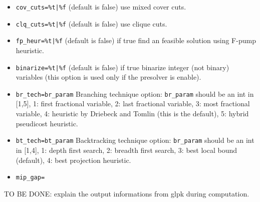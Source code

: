 \begin{mandescription}
\begin{description}
\begin{itemize}
\item \verb+cov_cuts=%t|%f+ (default is false) use mixed cover cuts.
\item \verb+clq_cuts=%t|%f+ (default is false) use clique cuts.
\item \verb+fp_heur=%t|%f+ (default is false) if true find an feasible solution using F-pump heuristic.
\item \verb+binarize=%t|%f+ (default is false) if true binarize integer (not binary) variables (this 
      option is used only if the presolver is enable).
\item \verb+br_tech=br_param+ Branching technique option: \verb+br_param+ should be an int in [1,5],
      1: first fractional variable, 2: last fractional variable, 3: most fractional variable, 4:
      heuristic by Driebeck and Tomlin (this is the default), 5: hybrid pseudicost heuristic.
\item \verb+bt_tech=bt_param+ Backtracking technique option:  \verb+br_param+ should be an int in [1,4],
      1: depth first search, 2: breadth first search, 3: best local bound (default), 4: best projection heuristic.
\item \verb+mip_gap=+
\end{itemize}
\end{description}


TO BE DONE: explain the output informations from glpk during computation. 

\end{mandescription} 

